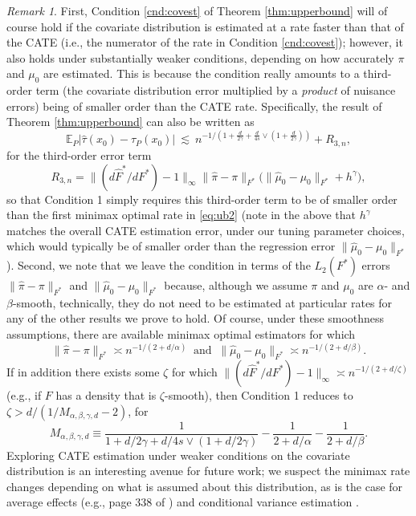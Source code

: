 \documentclass[11pt,twoside]{article}
\newcommand{\E}{\mathbb{E}}
\theoremstyle{definition}
\theoremstyle{remark}
\newtheorem{remark}{Remark}
\begin{document}
\begin{remark} \label{rem:cond1}
First, Condition \ref{cnd:covest} of Theorem \ref{thm:upperbound} will of course hold if the covariate distribution is estimated at a rate faster than that of the CATE (i.e., the numerator of the rate in Condition \ref{cnd:covest}); however, it also holds under substantially weaker conditions, depending on how accurately $\pi$ and $\mu_0$ are estimated. This is because the condition really amounts to a third-order term (the covariate distribution error {multiplied} by a \emph{product} of nuisance errors) being of smaller order than the CATE rate.  Specifically, the result of Theorem \ref{thm:upperbound} can also be written as
\begin{equation} \label{eq:ub2}
 \E_P | \widehat\tau(x_0) - \tau_P(x_0)| \ \lesssim \ n^{-1/\left(1 + \frac{d}{2\gamma} + \frac{d}{4s} \vee \left(1 + \frac{d}{2\gamma}\right) \right) } + R_{3,n} , 
\end{equation}
for the third-order error term 
$$ R_{3,n} = \| (d\widehat{F}^*/dF^*)-1 \|_\infty \| \widehat\pi-\pi \|_{F^*} \Big(\| \widehat\mu_0-\mu_0 \|_{F^*} + h^\gamma \Big) , $$
so that Condition 1 simply requires this third-order term to be of smaller order than the first minimax optimal rate in \eqref{eq:ub2} (note in the above that $h^\gamma$ matches the overall CATE estimation error, under our tuning parameter choices, which would typically be of smaller order than the regression error $\| \widehat\mu_0 - \mu_0 \|_{F^*}$). 
Second, we note that we leave the condition in terms of the $L_2(F^*)$ errors $\| \widehat\pi-\pi \|_{F^*}$ and $\| \widehat\mu_0-\mu_0 \|_{F^*}$ because, although we assume $\pi$ and $\mu_0$ are $\alpha$- and $\beta$-smooth, technically, they do not need to be estimated at particular rates for any of the other results we prove to hold. Of course, under these smoothness assumptions, there are available minimax optimal estimators for which 
$$ \| \widehat\pi-\pi \|_{F^*} \asymp n^{-1/(2+d/\alpha)} \ \text{ and } \ \| \widehat\mu_0-\mu_0 \|_{F^*} \asymp n^{-1/(2+d/\beta)} . $$
If in addition there exists some $\zeta$ for which $\| (d\widehat{F}^*/dF^*)-1 \|_\infty \asymp n^{-1/(2+d/\zeta)}$ (e.g., if $F$ has a density that is $\zeta$-smooth), then Condition 1 reduces to  $ \zeta > {d}/{(1/M_{\alpha,\beta,\gamma,d}-2)}$, for
$$  M_{\alpha,\beta,\gamma,d} \equiv  \frac{1}{1+d/2\gamma + d/4s \vee (1 + d/2\gamma)}  -\frac{1}{2+d/\alpha} -  \frac{1}{2+d/\beta}  . $$
Exploring CATE estimation under weaker conditions on the covariate distribution is an interesting avenue for future work; we suspect the minimax rate changes depending on what is assumed about this distribution, as is the case for average effects (e.g.,  page 338 of \citet{robins2008higher}) and conditional variance estimation \citep{wang2008effect, shen2020optimal}. \\
\end{remark}
\end{document}
